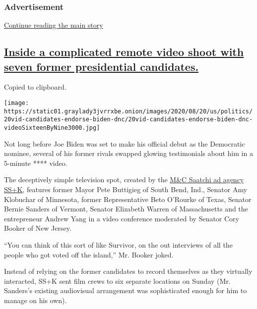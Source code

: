 \hypertarget{advertisement-1}{%
\subsubsection{Advertisement}\label{advertisement-1}}

\protect\hyperlink{after-dfp-ad-mid2}{Continue reading the main story}

\hypertarget{inside-a-complicated-remote-video-shoot-with-seven-former-presidential-candidates}{%
\subsection{\texorpdfstring{\protect\hyperlink{inside-a-complicated-remote-video-shoot-with-seven-former-presidential-candidates}{Inside
a complicated remote video shoot with seven former presidential
candidates.}}{Inside a complicated remote video shoot with seven former presidential candidates.}}\label{inside-a-complicated-remote-video-shoot-with-seven-former-presidential-candidates}}

Copied to clipboard.

\texttt{[image: https://static01.graylady3jvrrxbe.onion/images/2020/08/20/us/politics/20vid-candidates-endorse-biden-dnc/20vid-candidates-endorse-biden-dnc-videoSixteenByNine3000.jpg]}

Not long before Joe Biden was set to make his official debut as the
Democratic nominee, several of his former rivals swapped glowing
testimonials about him in a 5-minute **** video.

The deceptively simple television spot, created by the
\href{https://www.nytimes3xbfgragh.onion/2014/11/18/business/media/mc-saatchi-buys-a-stake-in-ssk.html}{M\&C
Saatchi ad agency SS+K}, features former Mayor Pete Buttigieg of South
Bend, Ind., Senator Amy Klobuchar of Minnesota, former Representative
Beto O'Rourke of Texas, Senator Bernie Sanders of Vermont, Senator
Elizabeth Warren of Massachusetts and the entrepreneur Andrew Yang in a
video conference moderated by Senator Cory Booker of New Jersey.

``You can think of this sort of like Survivor, on the out interviews of
all the people who got voted off the island,'' Mr. Booker joked.

Instead of relying on the former candidates to record themselves as they
virtually interacted, SS+K sent film crews to six separate locations on
Sunday (Mr. Sanders's existing audiovisual arrangement was sophisticated
enough for him to manage on his own).

